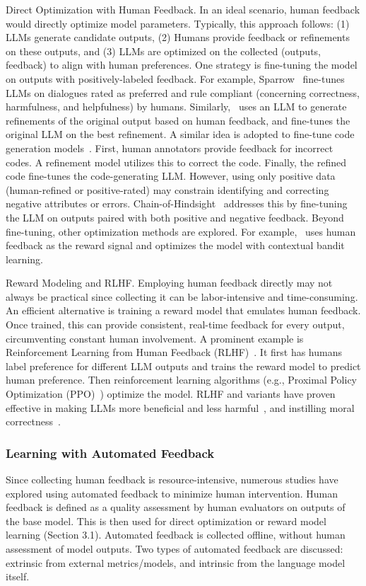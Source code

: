 \documentclass[12pt]{extarticle}
\begin{document}
Direct Optimization with Human Feedback. In an ideal scenario, human feedback would directly optimize model parameters. Typically, this approach follows: (1) LLMs generate candidate outputs, (2) Humans provide feedback or refinements on these outputs, and (3) LLMs are optimized on the collected (outputs, feedback) to align with human preferences. One strategy is fine-tuning the model on outputs with positively-labeled feedback. For example, Sparrow~\cite{glaese2022improving} fine-tunes LLMs on dialogues rated as preferred and rule compliant (concerning correctness, harmfulness, and helpfulness) by humans. Similarly,~\cite{scheurer2023training} uses an LLM to generate refinements of the original output based on human feedback, and fine-tunes the original LLM on the best refinement. A similar idea is adopted to fine-tune code generation models~\cite{chen2023improving}. First, human annotators provide feedback for incorrect codes. A refinement model utilizes this to correct the code. Finally, the refined code fine-tunes the code-generating LLM. However, using only positive data (human-refined or positive-rated) may constrain identifying and correcting negative attributes or errors. Chain-of-Hindsight~\cite{liu2023chain} addresses this by fine-tuning the LLM on outputs paired with both positive and negative feedback. Beyond fine-tuning, other optimization methods are explored. For example,~\cite{gao2023continually} uses human feedback as the reward signal and optimizes the model with contextual bandit learning.

Reward Modeling and RLHF. Employing human feedback directly may not always be practical since collecting it can be labor-intensive and time-consuming. An efficient alternative is training a reward model that emulates human feedback. Once trained, this can provide consistent, real-time feedback for every output, circumventing constant human involvement. A prominent example is Reinforcement Learning from Human Feedback (RLHF)~\cite{ouyang2022training}. It first has humans label preference for different LLM outputs and trains the reward model to predict human preference. Then reinforcement learning algorithms (e.g., Proximal Policy Optimization (PPO)~\cite{schulman2017proximal}) optimize the model. RLHF and variants have proven effective in making LLMs more beneficial and less harmful~\cite{bai2022training}, and instilling moral correctness~\cite{ganguli2023capacity}.

\subsubsection{Learning with Automated Feedback}
Since collecting human feedback is resource-intensive, numerous studies have explored using automated feedback to minimize human intervention. Human feedback is defined as a quality assessment by human evaluators on outputs of the base model. This is then used for direct optimization or reward model learning (Section 3.1). Automated feedback is collected offline, without human assessment of model outputs. Two types of automated feedback are discussed: extrinsic from external metrics/models, and intrinsic from the language model itself.
\end{document}
